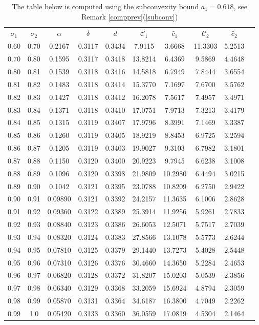 \documentclass[10pt]{amsart}
\newcommand{\s}{\sigma}
\theoremstyle{definition}
\numberwithin{equation}{section}
\begin{document}
\begin{table}[h!]
\vskip6pt
\caption*{The table below is computed using the subconvexity bound $a_1=0.618$, see Remark \ref{compprev}(\ref{subconv})}
\begin{tabular}{cccccccccc}
\hline
$\s_1$ & $\s_2$ & $\alpha$ & $\delta$ & $d$  & $\mathcal{C}_1$ & $\tilde{c_1}$ & $\mathcal{C}_2$ & $\tilde{c_2}$ \\
0.60 & 0.70 & 0.2167 & 0.3117 & 0.3434 & 7.9115 & 3.6668 & 11.3303 & 5.2513 \\
0.70 & 0.80 & 0.1595 & 0.3117 & 0.3418 & 13.8214 & 6.4369 & 9.5869 & 4.4648 \\
0.80 & 0.81 & 0.1539 & 0.3118 & 0.3416 & 14.5818 & 6.7949 & 7.8444 & 3.6554 \\
0.81 & 0.82 & 0.1483 & 0.3118 & 0.3414 & 15.3770 & 7.1697 & 7.6700 & 3.5762 \\
0.82 & 0.83 & 0.1427 & 0.3118 & 0.3412 & 16.2078 & 7.5617 & 7.4957 & 3.4971 \\
0.83 & 0.84 & 0.1371 & 0.3118 & 0.3410 & 17.0751 & 7.9713 & 7.3213 & 3.4179 \\
0.84 & 0.85 & 0.1315 & 0.3119 & 0.3407 & 17.9796 & 8.3991 & 7.1469 & 3.3387 \\
0.85 & 0.86 & 0.1260 & 0.3119 & 0.3405 & 18.9219 & 8.8453 & 6.9725 & 3.2594 \\
0.86 & 0.87 & 0.1205 & 0.3119 & 0.3403 & 19.9027 & 9.3103 & 6.7982 & 3.1801 \\
0.87 & 0.88 & 0.1150 & 0.3120 & 0.3400 & 20.9223 & 9.7945 & 6.6238 & 3.1008 \\
0.88 & 0.89 & 0.1096 & 0.3120 & 0.3398 & 21.9809 & 10.2980 & 6.4494 & 3.0215 \\
0.89 & 0.90 & 0.1042 & 0.3121 & 0.3395 & 23.0788 & 10.8209 & 6.2750 & 2.9422 \\
0.90 & 0.91 & 0.09890 & 0.3121 & 0.3392 & 24.2157 & 11.3635 & 6.1006 & 2.8628 \\
0.91 & 0.92 & 0.09360 & 0.3122 & 0.3389 & 25.3914 & 11.9256 & 5.9261 & 2.7833 \\
0.92 & 0.93 & 0.08840 & 0.3123 & 0.3386 & 26.6053 & 12.5071 & 5.7517 & 2.7039 \\
0.93 & 0.94 & 0.08320 & 0.3124 & 0.3383 & 27.8566 & 13.1078 & 5.5773 & 2.6244 \\
0.94 & 0.95 & 0.07810 & 0.3125 & 0.3379 & 29.1440 & 13.7273 & 5.4028 & 2.5448 \\
0.95 & 0.96 & 0.07310 & 0.3126 & 0.3376 & 30.4660 & 14.3650 & 5.2284 & 2.4653 \\
0.96 & 0.97 & 0.06820 & 0.3128 & 0.3372 & 31.8207 & 15.0203 & 5.0539 & 2.3856 \\
0.97 & 0.98 & 0.06340 & 0.3129 & 0.3368 & 33.2059 & 15.6924 & 4.8794 & 2.3059 \\
0.98 & 0.99 & 0.05870 & 0.3131 & 0.3364 & 34.6187 & 16.3800 & 4.7049 & 2.2262 \\
0.99 & 1.0 & 0.05420 & 0.3133 & 0.3360 & 36.0559 & 17.0819 & 4.5304 & 2.1464 \\
\hline
\hline
\end{tabular}
\end{table}
%
\end{document}
